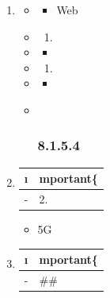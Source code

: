 \begin{enumerate}
\def\labelenumi{\arabic{enumi}.}
\item
  \important{}

  \begin{itemize}
  \item
    \begin{itemize}
    \tightlist
    \item
      Web
    \end{itemize}
  \item
    \begin{enumerate}
    \def\labelenumii{\arabic{enumii}.}
        \item
      \important{}
    \end{enumerate}
  \item
    \begin{itemize}
    \tightlist
    \item
    \end{itemize}
  \item
    \begin{enumerate}
    \def\labelenumii{\arabic{enumii}.}
        \item
      \important{}
    \end{enumerate}
  \item
    \begin{itemize}
    \tightlist
    \item
    \end{itemize}
  \item ~
    \hypertarget{section-58}{%
    \subsubsection{8.1.5.4}\label{section-58}}
  \end{itemize}
\item
  \begin{longtable}[]{@{}ll@{}}
  \toprule\noalign{}
  \i & mportant\{} \\
  \midrule\noalign{}
  \endhead
  \bottomrule\noalign{}
  \endlastfoot
  - & 2. \important{} \\
  \end{longtable}

  \begin{itemize}
  \tightlist
  \item
    5G
  \end{itemize}
\item
  \begin{longtable}[]{@{}ll@{}}
  \toprule\noalign{}
  \i & mportant\{} \\
  \midrule\noalign{}
  \endhead
  \bottomrule\noalign{}
  \endlastfoot
  - & \#\# \\
  \end{longtable}
\end{enumerate}


